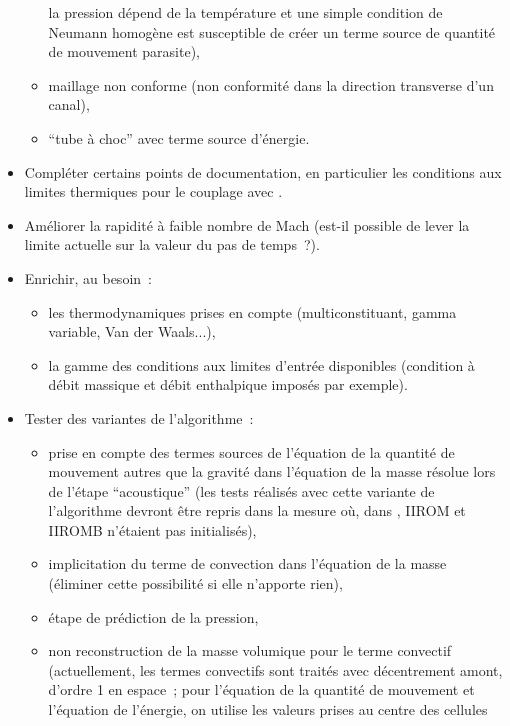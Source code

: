 \begin{itemize}
\begin{itemize}
        la pression dépend de la température et une simple condition de
        Neumann homogène est susceptible de créer un terme source de
        quantité de mouvement parasite),
        \item maillage non conforme (non conformité dans la direction
        transverse d'un canal),
      \item ``tube à choc'' avec terme source d'énergie.
        \end{itemize}
\item Compléter certains points de documentation, en particulier les
        conditions aux limites thermiques pour le couplage avec \syrthes.
\item Améliorer la rapidité à faible nombre de Mach (est-il
possible de lever la limite
actuelle sur la valeur du pas de temps~?).
\item Enrichir, au besoin~:
        \begin{itemize}
        \item les thermodynamiques prises en compte (multiconstituant,
        gamma variable, Van der Waals...),
        \item la gamme des conditions aux limites d'entrée
        disponibles (condition à débit massique et débit enthalpique
        imposés par exemple).
        \end{itemize}
\item Tester des variantes de l'algorithme~:
        \begin{itemize}
        \item prise en compte des termes sources de l'équation de la
        quantité de mouvement autres que la gravité dans l'équation de la
        masse résolue lors de l'étape ``acoustique'' (les tests réalisés
        avec cette variante de l'algorithme devront être repris dans la
        mesure où, dans , IIROM et IIROMB n'étaient pas
        initialisés),
        \item implicitation du terme de convection dans
        l'équation de la masse (éliminer cette possibilité si
        elle n'apporte rien),
        \item étape de prédiction de la pression,
        \item non reconstruction de la masse volumique pour le terme convectif
        (actuellement, les termes convectifs sont traités avec
        décentrement amont, d'ordre 1 en espace~;
        pour l'équation de la quantité de mouvement et l'équation de
        l'énergie, on utilise les valeurs prises au centre des cellules

\end{itemize}
\end{itemize}
